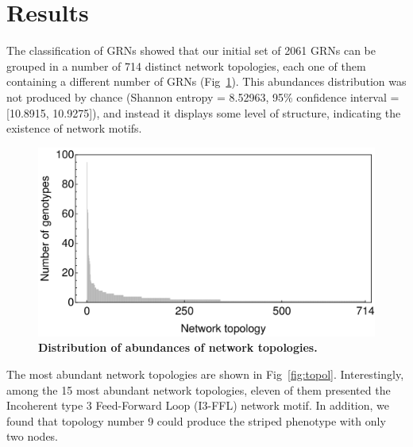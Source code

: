 \documentclass[10pt,letterpaper]{article}
\begin{document}
\section*{Results}

The classification of GRNs showed that our initial set of 2061 GRNs can be 
grouped in a number of 714 distinct network topologies, each one of them
containing a different number of GRNs (Fig~\ref{fig:distopol}). This abundances
distribution was not produced by chance (Shannon entropy = 8.52963, 95\%
confidence interval = [10.8915, 10.9275]), and instead it displays some level 
of structure, indicating the existence of network motifs.

\begin{figure}[!h]
 \center
 \includegraphics[width=\textwidth]{figures/results/distribution_topologies_en}
 \caption{\bf Distribution of abundances of network topologies.}
 \label{fig:distopol}
\end{figure}

The most abundant network topologies are shown in Fig~\ref{fig:topol}. 
Interestingly, among the 15 most abundant network topologies, eleven of them 
presented the Incoherent type 3 Feed-Forward Loop (I3-FFL) network motif. In 
addition, we found that topology number 9 could produce the striped phenotype 
with only two nodes.
\end{document}
